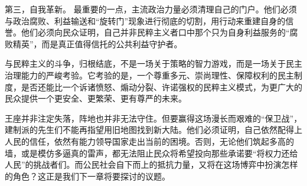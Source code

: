 第三，自我革新。 最重要的一点，主流政治力量必须清理自己的门户。他们必须与政治腐败、利益输送和“旋转门”现象进行彻底的切割，用行动来重建自身的信誉。他们必须向民众证明，自己并非民粹主义者口中那个只为自身利益服务的“腐败精英”，而是真正值得信托的公共利益守护者。

与民粹主义的斗争，归根结底，不是一场关于策略的智力游戏，而是一场关于民主治理能力的严峻考验。它考验的是，一个尊重多元、崇尚理性、保障权利的民主制度，是否还能比一个诉诸愤怒、煽动分裂、许诺强权的民粹主义模式，为更广大的民众提供一个更安全、更繁荣、更有尊严的未来。

王座并非注定失落，阵地也并非无法守住。但要赢得这场漫长而艰难的“保卫战”，建制派的先生们不能再指望用旧地图找到新大陆。他们必须证明，自己依然配得上人民的信任，依然有能力领导国家走出当前的困境。否则，无论他们筑起多高的墙，或是模仿多逼真的雷声，都无法阻止民众将希望投向那些承诺要“将权力还给人民”的挑战者们。而公民社会自下而上的抵抗力量，又将在这场博弈中扮演怎样的角色？这正是我们下一章将要探讨的议题。